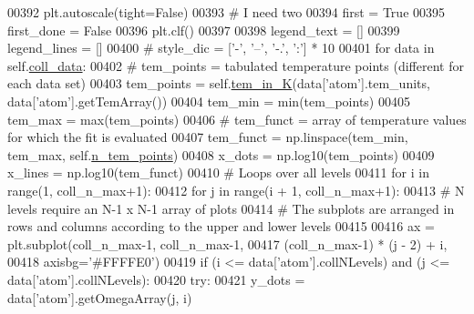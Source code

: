 \begin{DoxyCode}
00392         plt.autoscale(tight=\textcolor{keyword}{False})
00393         \textcolor{comment}{# I need two }
00394         first = \textcolor{keyword}{True}
00395         first\_done = \textcolor{keyword}{False}
00396         plt.clf()
00397         
00398         legend\_text = []
00399         legend\_lines = []
00400 \textcolor{comment}{#        style\_dic = ['-', '--', '-.', ':'] * 10}
00401         \textcolor{keywordflow}{for} data \textcolor{keywordflow}{in} self.\hyperlink{classpyneb_1_1plot_1_1plot_atomic_data_1_1_data_plot_a50a9af3695633a64c66d082ed67d1bfb}{coll\_data}:
00402             \textcolor{comment}{# tem\_points = tabulated temperature points (different for each data set)}
00403             tem\_points = self.\hyperlink{classpyneb_1_1plot_1_1plot_atomic_data_1_1_data_plot_a13bb54a69f98e9761bacb4b98f481619}{tem\_in\_K}(data[\textcolor{stringliteral}{'atom'}].tem\_units, data[\textcolor{stringliteral}{'atom'}].getTemArray())
00404             tem\_min = min(tem\_points)
00405             tem\_max = max(tem\_points)
00406             \textcolor{comment}{# tem\_funct = array of temperature values for which the fit is evaluated}
00407             tem\_funct = np.linspace(tem\_min, tem\_max, self.\hyperlink{classpyneb_1_1plot_1_1plot_atomic_data_1_1_data_plot_a9f92ae121756c0e3d3624f11e3d2ae17}{n\_tem\_points})
00408             x\_dots = np.log10(tem\_points)
00409             x\_lines = np.log10(tem\_funct)
00410             \textcolor{comment}{# Loops over all levels}
00411             \textcolor{keywordflow}{for} i \textcolor{keywordflow}{in} range(1, coll\_n\_max+1):
00412                 \textcolor{keywordflow}{for} j \textcolor{keywordflow}{in} range(i + 1, coll\_n\_max+1):                
00413                         \textcolor{comment}{# N levels require an N-1 x N-1 array of plots}
00414                         \textcolor{comment}{# The subplots are arranged in rows and columns according to the upper and lower
       levels}
00415  
00416                         ax = plt.subplot(coll\_n\_max-1, coll\_n\_max-1, 
00417                                          (coll\_n\_max-1) * (j - 2) + i,
00418                                          axisbg=\textcolor{stringliteral}{'#FFFFE0'})
00419                         \textcolor{keywordflow}{if} (i <= data[\textcolor{stringliteral}{'atom'}].collNLevels) \textcolor{keywordflow}{and} (j <= data[\textcolor{stringliteral}{'atom'}].collNLevels):
00420                             \textcolor{keywordflow}{try}:
00421                                 y\_dots = data[\textcolor{stringliteral}{'atom'}].getOmegaArray(j, i)

\end{DoxyCode}

